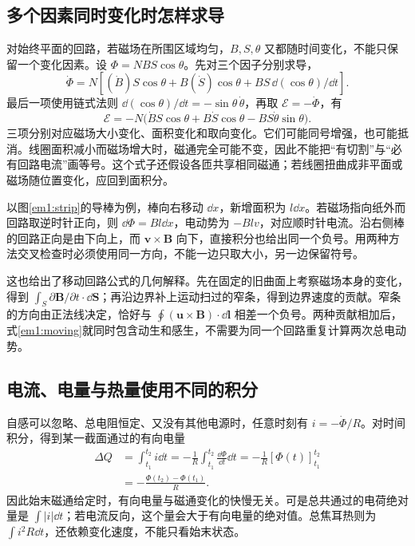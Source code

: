 \subsection{多个因素同时变化时怎样求导}
对始终平面的回路，若磁场在所围区域均匀，$B,S,\theta$ 又都随时间变化，不能只保留一个变化因素。设 $\Phi=NBS\cos\theta$。先对三个因子分别求导，
\[
\dot\Phi=N[(\dot B)S\cos\theta+B(\dot S)\cos\theta
+BS\,\dd(\cos\theta)/\dd t].
\]
最后一项使用链式法则 $\dd(\cos\theta)/\dd t=-\sin\theta\,\dot\theta$，再取 $\mathcal E=-\dot\Phi$，有
\[\mathcal E=-N\bigl(\dot B S\cos\theta+B\dot S\cos\theta-BS\dot\theta\sin\theta\bigr).\]
三项分别对应磁场大小变化、面积变化和取向变化。它们可能同号增强，也可能抵消。线圈面积减小而磁场增大时，磁通完全可能不变，因此不能把“有切割”与“必有回路电流”画等号。这个式子还假设各匝共享相同磁通；若线圈扭曲成非平面或磁场随位置变化，应回到面积分。


以图\ref{em1:strip}的导棒为例，棒向右移动 $\dd x$，新增面积为 $l\dd x$。若磁场指向纸外而回路取逆时针正向，则 $\dd\Phi=Bl\dd x$，电动势为 $-Blv$，对应顺时针电流。沿右侧棒的回路正向是由下向上，而 $\bm v\times\bm B$ 向下，直接积分也给出同一个负号。用两种方法交叉检查时必须使用同一方向，不能一边只取大小，另一边保留符号。


这也给出了移动回路公式的几何解释。先在固定的旧曲面上考察磁场本身的变化，得到 $\int_S\partial\bm B/\partial t\cdot\dd\bm S$；再沿边界补上运动扫过的窄条，得到边界速度的贡献。窄条的方向由正法线决定，恰好与 $\oint(\bm u\times\bm B)\cdot\dd\bm l$ 相差一个负号。两种贡献相加后，式\eqref{em1:moving}就同时包含动生和感生，不需要为同一个回路重复计算两次总电动势。


\subsection{电流、电量与热量使用不同的积分}
自感可以忽略、总电阻恒定、又没有其他电源时，任意时刻有 $i=-\dot\Phi/R$。对时间积分，得到某一截面通过的有向电量
\[
 \begin{aligned}
 \Delta Q&=\int_{t_1}^{t_2}i\dd t
 =-\frac1R\int_{t_1}^{t_2}\frac{\dd\Phi}{\dd t}\dd t
 =-\frac1R[\Phi(t)]_{t_1}^{t_2}\\
 &=-\frac{\Phi(t_2)-\Phi(t_1)}{R}.
 \end{aligned}
\]
因此始末磁通给定时，有向电量与磁通变化的快慢无关。可是总共通过的电荷绝对量是 $\int|i|\dd t$；若电流反向，这个量会大于有向电量的绝对值。总焦耳热则为 $\int i^2R\dd t$，还依赖变化速度，不能只看始末状态。


